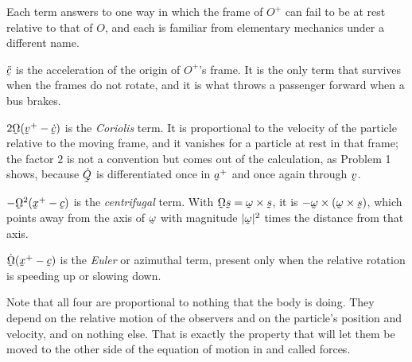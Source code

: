 \begin{remark}\label{rem:ch7fourterms}
Each term answers to one way in which the frame of $O^{+}$ can fail to be
at rest relative to that of $O$, and each is familiar from elementary
mechanics under a different name.

$\ddot\bc$ is the acceleration of the origin of $O^{+}$'s frame. It is
the only term that survives when the frames do not rotate, and it is what
throws a passenger forward when a bus brakes.

$2\bOm(\bv^{+}-\dot\bc)$ is the \emph{Coriolis} term. It is proportional
to the velocity of the particle relative to the moving frame, and it
vanishes for a particle at rest in that frame; the factor $2$ is not a
convention but comes out of the calculation, as Problem 1 shows, because
$\dot\bQ$ is differentiated once in $\ba^{+}$ and once again through
$\bv$.

$-\bOm^{2}(\bx^{+}-\bc)$ is the \emph{centrifugal} term. With
$\bOm\bs=\bom\times\bs$, it is $-\bom\times(\bom\times\bs)$, which points
away from the axis of $\bom$ with magnitude $|\bom|^{2}$ times the
distance from that axis.

$\dot\bOm(\bx^{+}-\bc)$ is the \emph{Euler} or azimuthal term, present
only when the relative rotation is speeding up or slowing down.

Note that all four are proportional to nothing that the body is doing.
They depend on the relative motion of the observers and on the particle's
position and velocity, and on nothing else. That is exactly the property
that will let them be moved to the other side of the equation of motion
in  and called forces.
\end{remark}


